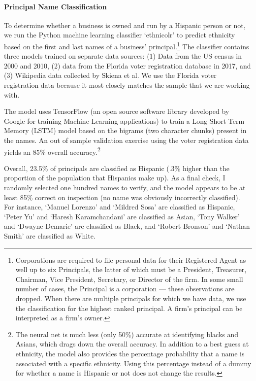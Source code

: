 \documentclass[11pt]{article}
\begin{document}
\paragraph{Principal Name Classification} To determine whether a business is owned and run by a Hispanic person or not, we run the Python machine learning classifier `ethnicolr' to predict ethnicity based on the first and last names of a business' principal.\footnote{ Corporations are required to file personal data for their Registered Agent as well up to six Principals, the latter of which must be a President, Treasurer, Chairman, Vice President, Secretary, or Director of the firm. In some small number of cases, the Principal is a corporation --- these observations are dropped. When there are multiple principals for which we have data, we use the classification for the highest ranked principal. A firm's principal can be interpreted as a firm's owner.} The classifier contains three models trained on separate data sources: (1) Data from the US census in 2000 and 2010, (2) data from the Florida voter registration database in 2017, and (3) Wikipedia data collected by Skiena et al. We use the Florida voter registration data because it most closely matches the sample that we are working with. 

The model uses TensorFlow (an open source software library developed by Google for training Machine Learning applications) to train a Long Short-Term Memory (LSTM) model based on the bigrams (two character chunks) present in the names. An out of sample validation exercise using the voter registration data yields an 85\% overall accuracy.\footnote{ The neural net is much less (only 50\%) accurate at identifying blacks and Asians, which drags down the overall accuracy. In addition to a best guess at ethnicity, the model also provides the percentage probability that a name is associated with a specific ethnicity. Using this percentage instead of a dummy for whether a name is Hispanic or not does not change the results. } 

Overall, 23.5\% of principals are classified as Hispanic (.3\% higher than the proportion of the population that Hispanics make up). As a final check, I randomly selected one hundred names to verify, and the model appears to be at least 85\% correct on inspection (no name was obviously incorrectly classified). For instance, `Manuel Lorenzo' and `Mildred Sosa' are classified as Hispanic, `Peter Yu' and `Haresh Karamchandani' are classified as Asian, `Tony Walker' and `Dwayne Demarie' are classified as Black, and `Robert Bronson' and `Nathan Smith' are classified as White. 
\end{document}
